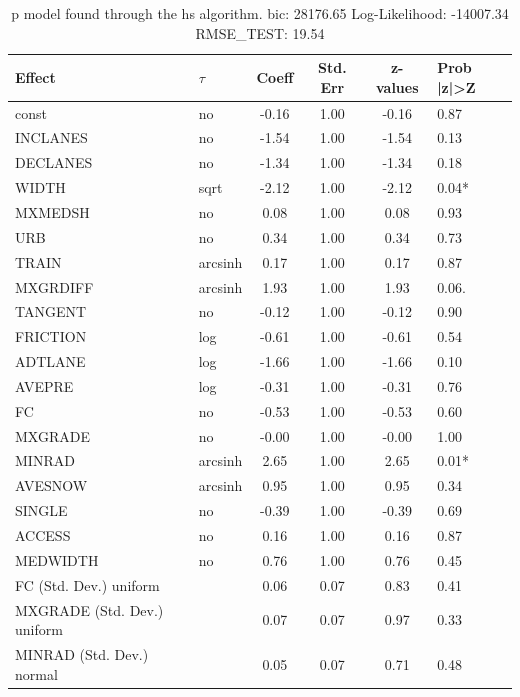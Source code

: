 \begin{table}
	\caption{p model found through the hs algorithm. bic: 28176.65 Log-Likelihood: -14007.34 RMSE_TEST: 19.54}
	\begin{center}
		\begin{tabular}{|l|l|c|c|c|l|}
			\hline
			Effect & $\tau$ & Coeff & Std. Err & z-values & Prob |z|>Z \\
			\hline
			const & no & -0.16 & 1.00 & -0.16 & 0.87 \\
			\hline
			INCLANES & no & -1.54 & 1.00 & -1.54 & 0.13 \\
			\hline
			DECLANES & no & -1.34 & 1.00 & -1.34 & 0.18 \\
			\hline
			WIDTH & sqrt & -2.12 & 1.00 & -2.12 & 0.04* \\
			\hline
			MXMEDSH & no & 0.08 & 1.00 & 0.08 & 0.93 \\
			\hline
			URB & no & 0.34 & 1.00 & 0.34 & 0.73 \\
			\hline
			TRAIN & arcsinh & 0.17 & 1.00 & 0.17 & 0.87 \\
			\hline
			MXGRDIFF & arcsinh & 1.93 & 1.00 & 1.93 & 0.06. \\
			\hline
			TANGENT & no & -0.12 & 1.00 & -0.12 & 0.90 \\
			\hline
			FRICTION & log & -0.61 & 1.00 & -0.61 & 0.54 \\
			\hline
			ADTLANE & log & -1.66 & 1.00 & -1.66 & 0.10 \\
			\hline
			AVEPRE & log & -0.31 & 1.00 & -0.31 & 0.76 \\
			\hline
			FC & no & -0.53 & 1.00 & -0.53 & 0.60 \\
			\hline
			MXGRADE & no & -0.00 & 1.00 & -0.00 & 1.00 \\
			\hline
			MINRAD & arcsinh & 2.65 & 1.00 & 2.65 & 0.01* \\
			\hline
			AVESNOW & arcsinh & 0.95 & 1.00 & 0.95 & 0.34 \\
			\hline
			SINGLE & no & -0.39 & 1.00 & -0.39 & 0.69 \\
			\hline
			ACCESS & no & 0.16 & 1.00 & 0.16 & 0.87 \\
			\hline
			MEDWIDTH & no & 0.76 & 1.00 & 0.76 & 0.45 \\
			\hline
			FC (Std. Dev.) uniform &  & 0.06 & 0.07 & 0.83 & 0.41 \\
			\hline
			MXGRADE (Std. Dev.) uniform &  & 0.07 & 0.07 & 0.97 & 0.33 \\
			\hline
			MINRAD (Std. Dev.) normal &  & 0.05 & 0.07 & 0.71 & 0.48 \\

\end{tabular}
\end{center}
\end{table}
